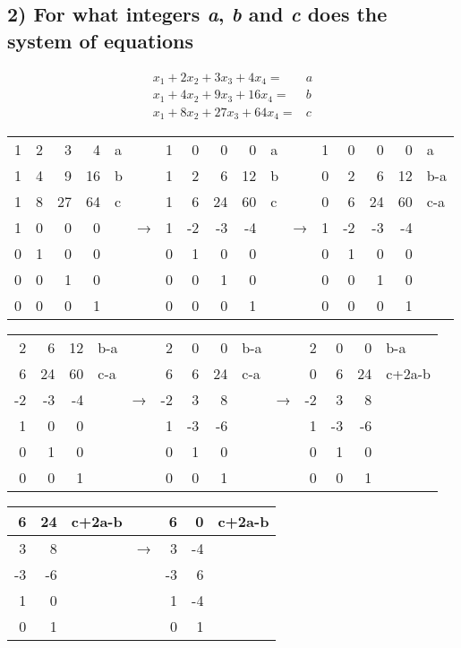 \documentclass[11pt]{article}
\begin{document}
\subsection*{2) For what integers \emph{a}, \emph{b} and \emph{c} does the system of equations}
\label{sec:orga9f4f10}

\begin{align*}
 x_1 + 2x_2 + 3x_3 + 4x_4 =& a\\
 x_1 + 4x_2 + 9x_3 + 16x_4 =& b\\
 x_1 + 8x_2 + 27x_3 + 64x_4 =& c
\end{align*}

\begin{center}
\begin{tabular}{rrrrllrrrrllrrrrl}
1 & 2 & 3 & 4 & a &  & 1 & 0 & 0 & 0 & a &  & 1 & 0 & 0 & 0 & a\\
1 & 4 & 9 & 16 & b &  & 1 & 2 & 6 & 12 & b &  & 0 & 2 & 6 & 12 & b-a\\
1 & 8 & 27 & 64 & c &  & 1 & 6 & 24 & 60 & c &  & 0 & 6 & 24 & 60 & c-a\\
\hline
1 & 0 & 0 & 0 &  & → & 1 & -2 & -3 & -4 &  & → & 1 & -2 & -3 & -4 & \\
0 & 1 & 0 & 0 &  &  & 0 & 1 & 0 & 0 &  &  & 0 & 1 & 0 & 0 & \\
0 & 0 & 1 & 0 &  &  & 0 & 0 & 1 & 0 &  &  & 0 & 0 & 1 & 0 & \\
0 & 0 & 0 & 1 &  &  & 0 & 0 & 0 & 1 &  &  & 0 & 0 & 0 & 1 & \\
\end{tabular}
\end{center}

\begin{center}
\begin{tabular}{rrrllrrrllrrrl}
2 & 6 & 12 & b-a &  & 2 & 0 & 0 & b-a &  & 2 & 0 & 0 & b-a\\
6 & 24 & 60 & c-a &  & 6 & 6 & 24 & c-a &  & 0 & 6 & 24 & c+2a-b\\
\hline
-2 & -3 & -4 &  & → & -2 & 3 & 8 &  & → & -2 & 3 & 8 & \\
1 & 0 & 0 &  &  & 1 & -3 & -6 &  &  & 1 & -3 & -6 & \\
0 & 1 & 0 &  &  & 0 & 1 & 0 &  &  & 0 & 1 & 0 & \\
0 & 0 & 1 &  &  & 0 & 0 & 1 &  &  & 0 & 0 & 1 & \\
\end{tabular}
\end{center}

\begin{center}
\begin{tabular}{rrllrrl}
6 & 24 & c+2a-b &  & 6 & 0 & c+2a-b\\
\hline
3 & 8 &  & → & 3 & -4 & \\
-3 & -6 &  &  & -3 & 6 & \\
1 & 0 &  &  & 1 & -4 & \\
0 & 1 &  &  & 0 & 1 & \\
\end{tabular}
\end{center}
\end{document}
